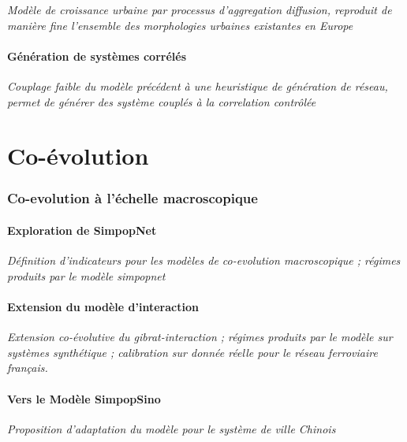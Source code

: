 \textit{Modèle de croissance urbaine par processus d'aggregation diffusion, reproduit de manière fine l'ensemble des morphologies urbaines existantes en Europe}


\subsection{Génération de systèmes corrélés}

\textit{Couplage faible du modèle précédent à une heuristique de génération de réseau, permet de générer des système couplés à la correlation contrôlée}





\part{Co-évolution}


\section{Co-evolution à l'échelle macroscopique}

\subsection{Exploration de SimpopNet}

\textit{Définition d'indicateurs pour les modèles de co-evolution macroscopique ; régimes produits par le modèle simpopnet}

\subsection{Extension du modèle d'interaction}


\textit{Extension co-évolutive du gibrat-interaction ; régimes produits par le modèle sur systèmes synthétique ; calibration sur donnée réelle pour le réseau ferroviaire français.}


\subsection{Vers le Modèle SimpopSino}

\textit{Proposition d'adaptation du modèle pour le système de ville Chinois}





